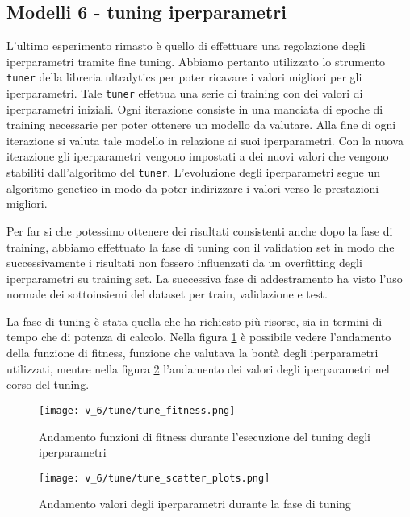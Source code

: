 \subsection*{Modelli 6 - tuning iperparametri}

L'ultimo esperimento rimasto è quello di effettuare una regolazione degli iperparametri tramite 
fine tuning. Abbiamo pertanto utilizzato lo strumento \texttt{tuner} della libreria ultralytics
per poter ricavare i valori migliori per gli iperparametri. Tale \texttt{tuner} effettua una serie 
di training con dei valori di iperparametri iniziali. Ogni iterazione consiste in una manciata
di epoche  di training necessarie per poter ottenere un modello da valutare. Alla fine di ogni 
iterazione si valuta tale modello in relazione ai suoi iperparametri. Con la nuova iterazione 
gli iperparametri vengono impostati a dei nuovi valori che vengono stabiliti dall'algoritmo del
\texttt{tuner}. L'evoluzione degli iperparametri segue un algoritmo genetico in modo da poter 
indirizzare i valori verso le prestazioni migliori.

Per far si che potessimo ottenere dei risultati consistenti anche dopo la fase di training, 
abbiamo effettuato la fase di tuning con il validation set in modo che successivamente i 
risultati non fossero influenzati da un overfitting degli iperparametri su training set.
La successiva fase di addestramento ha visto l'uso normale dei sottoinsiemi del dataset per 
train, validazione e test.

La fase di tuning è stata quella che ha richiesto più risorse, sia in termini di tempo che di 
potenza di calcolo. Nella figura \ref{fig:v6-1} è possibile vedere l'andamento della funzione 
di fitness, funzione che valutava la bontà degli iperparametri utilizzati, mentre nella figura 
\ref{fig:v6-2} l'andamento dei valori degli iperparametri nel corso del tuning.

\begin{figure}[!htb]
    \centering
    \texttt{[image: v\_6/tune/tune\_fitness.png]}
    \caption{Andamento funzioni di fitness durante l'esecuzione del tuning degli iperparametri}
    \label{fig:v6-1}
\end{figure}

\begin{figure}[!htb]
    \centering
    \texttt{[image: v\_6/tune/tune\_scatter\_plots.png]}
    \caption{Andamento valori degli iperparametri durante la fase di tuning}
    \label{fig:v6-2}
\end{figure}

